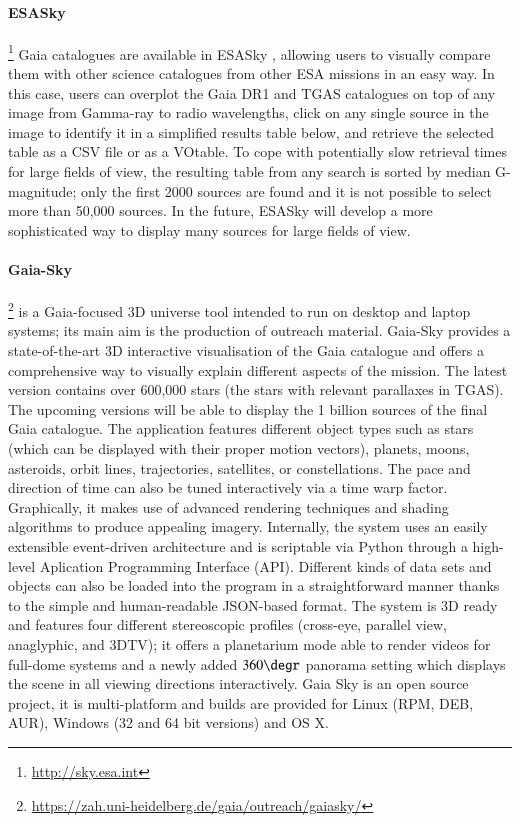 \documentclass[longauth, final]{aa}
\begin{document}
\paragraph{ESASky}\footnote{\url{http://sky.esa.int}} Gaia catalogues are  available in ESASky \citep{Baines2016}, allowing users to visually compare them with other science catalogues from other ESA missions in an easy way. In this case, users can overplot the Gaia DR1 and TGAS catalogues on top of any image from Gamma-ray to radio wavelengths, click on any single source in the image to identify it in a simplified results table below, and retrieve the selected table as a CSV file or as a VOtable. To cope with potentially slow retrieval times for large fields of view, the resulting table from any search is sorted by median G-magnitude;  only the first 2000 sources are found and it is not possible to select more than 50,000 sources. In the future, ESASky will develop a more sophisticated way to display many sources for large fields of view.


\paragraph{Gaia-Sky}\footnote{\url{https://zah.uni-heidelberg.de/gaia/outreach/gaiasky/}} is a Gaia-focused 3D universe tool intended to run on desktop and laptop systems; its main aim is the production of  outreach material. Gaia-Sky provides a state-of-the-art 3D interactive visualisation of the Gaia catalogue and offers a comprehensive way to visually explain different aspects of the mission.  The latest version contains over 600,000 stars (the stars with relevant parallaxes in TGAS). The  upcoming versions  will be able to display the 1 billion sources of the final Gaia catalogue. The application features different object types such as stars (which can be displayed with their proper motion vectors), planets, moons, asteroids, orbit lines, trajectories, satellites, or constellations. The pace and direction of time can also be tuned interactively via a time warp factor. Graphically, it makes use of advanced rendering techniques and shading algorithms to produce appealing imagery. Internally, the system uses an easily extensible event-driven architecture and is scriptable via Python through a high-level Aplication Programming Interface (API). Different kinds of data sets and objects can also be loaded into the program in a straightforward manner thanks to the simple and human-readable JSON-based format. The system is 3D ready and features four different stereoscopic profiles (cross-eye, parallel view, anaglyphic, and 3DTV); it offers a planetarium mode able to render videos for full-dome systems and a newly added $360{\degr}$ panorama setting which displays the scene in all viewing directions interactively. Gaia Sky is an open source project, it is multi-platform and builds are provided for Linux (RPM, DEB, AUR), Windows (32 and 64 bit versions) and OS X.
\end{document}
